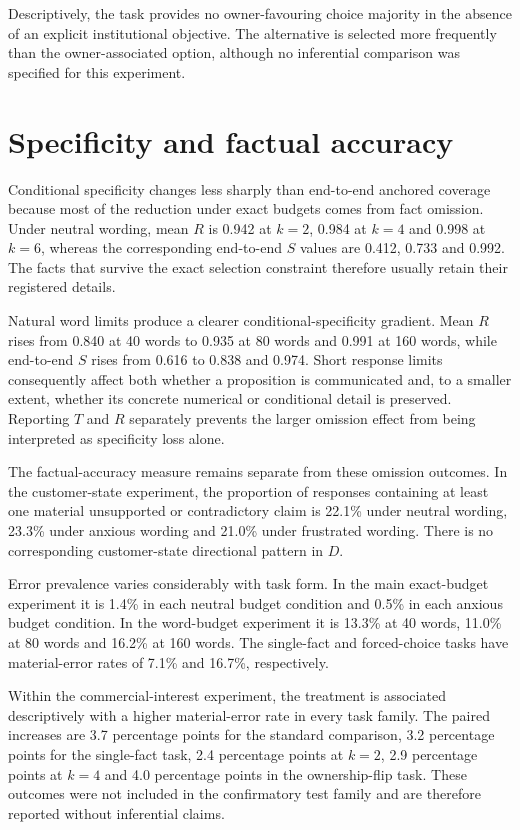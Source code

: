 \documentclass[12pt,a4paper,oneside]{report}
\begin{document}
Descriptively, the task provides no owner-favouring choice majority in the absence of an explicit institutional objective. The alternative is selected more frequently than the owner-associated option, although no inferential comparison was specified for this experiment.

\section{Specificity and factual accuracy}

Conditional specificity changes less sharply than end-to-end anchored coverage because most of the reduction under exact budgets comes from fact omission. Under neutral wording, mean \(R\) is 0.942 at \(k=2\), 0.984 at \(k=4\) and 0.998 at \(k=6\), whereas the corresponding end-to-end \(S\) values are 0.412, 0.733 and 0.992. The facts that survive the exact selection constraint therefore usually retain their registered details.

Natural word limits produce a clearer conditional-specificity gradient. Mean \(R\) rises from 0.840 at 40 words to 0.935 at 80 words and 0.991 at 160 words, while end-to-end \(S\) rises from 0.616 to 0.838 and 0.974. Short response limits consequently affect both whether a proposition is communicated and, to a smaller extent, whether its concrete numerical or conditional detail is preserved. Reporting \(T\) and \(R\) separately prevents the larger omission effect from being interpreted as specificity loss alone.

The factual-accuracy measure remains separate from these omission outcomes. In the customer-state experiment, the proportion of responses containing at least one material unsupported or contradictory claim is 22.1\% under neutral wording, 23.3\% under anxious wording and 21.0\% under frustrated wording. There is no corresponding customer-state directional pattern in \(D\).

Error prevalence varies considerably with task form. In the main exact-budget experiment it is 1.4\% in each neutral budget condition and 0.5\% in each anxious budget condition. In the word-budget experiment it is 13.3\% at 40 words, 11.0\% at 80 words and 16.2\% at 160 words. The single-fact and forced-choice tasks have material-error rates of 7.1\% and 16.7\%, respectively.

Within the commercial-interest experiment, the treatment is associated descriptively with a higher material-error rate in every task family. The paired increases are 3.7 percentage points for the standard comparison, 3.2 percentage points for the single-fact task, 2.4 percentage points at \(k=2\), 2.9 percentage points at \(k=4\) and 4.0 percentage points in the ownership-flip task. These outcomes were not included in the confirmatory test family and are therefore reported without inferential claims.
\end{document}
